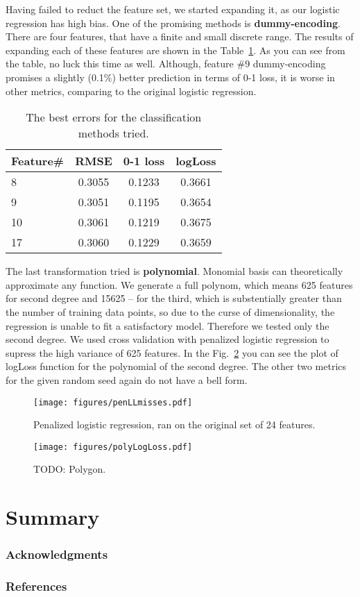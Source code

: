 \documentclass{article} %
\newcommand{\todo}[1]{}
\renewcommand{\todo}[1]{{\color{red} TODO: {#1}}}
\begin{document}
Having failed to reduct the feature set, we started expanding it, as our logistic regression has high bias. One of the promising methods is {\bf dummy-encoding}. There are four features, that have a finite and small discrete range. The results of expanding each of these features are shown in the Table~\ref{tab:classification-dummy}. As you can see from the table, no luck this time as well. Although, feature \#9 dummy-encoding promises a slightly (0.1\%) better prediction in terms of 0-1 loss, it is worse in other metrics, comparing to the original logistic regression.
\begin{table}[h]
  \begin{center}
    \begin{tabular}{l|ccc}
      Feature\# & RMSE & 0-1 loss & logLoss \\
      \hline
      8 & 0.3055 & 0.1233 & 0.3661 \\
      9 & 0.3051 & 0.1195 & 0.3654 \\
      10 & 0.3061 & 0.1219 & 0.3675 \\
      17 & 0.3060 & 0.1229 & 0.3659
    \end{tabular}
    \caption{The best errors for the classification methods tried.}
    \label{tab:classification-dummy}
  \end{center}
\end{table}

The last transformation tried is {\bf polynomial}. Monomial basis can theoretically approximate any function. We generate a full polynom, which means 625 features for second degree and 15625 -- for the third, which is substentially greater than the number of training data points, so due to the curse of dimensionality, the regression is unable to fit a satisfactory model. Therefore we tested only the second degree. We used cross validation with penalized logistic regression to supress the high variance of 625 features. In the Fig.~\ref{fig:polyErrors} you can see the plot of logLoss function for the polynomial of the second degree. The other two metrics for the given random seed again do not have a bell form.

\begin{figure}[!t]
\center
\texttt{[image: figures/penLLmisses.pdf]}
\caption{Penalized logistic regression, ran on the original set of 24 features.}
\label{fig:penLLmisses}
\end{figure}


\begin{figure}[!t]
\center
\texttt{[image: figures/polyLogLoss.pdf]}
\caption{\todo{Polygon.}}
\label{fig:polyErrors}
\end{figure}



\section{Summary}

\subsubsection*{Acknowledgments}

\subsubsection*{References}
\end{document}
